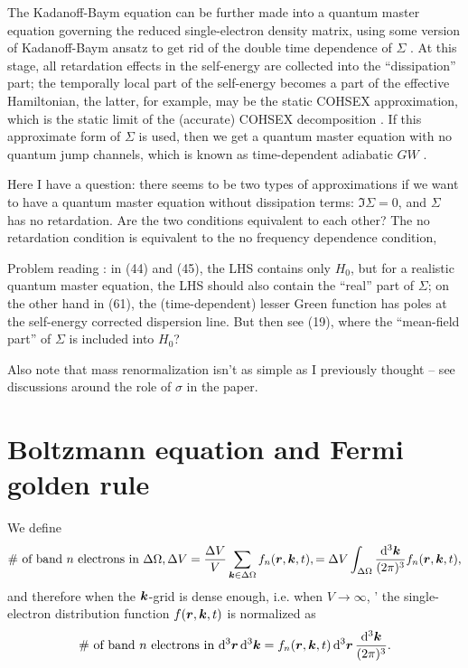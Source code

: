 \documentclass[hyperref, a4paper]{article}
\begin{document}
The Kadanoff-Baym equation can be further made into a quantum master equation 
governing the reduced single-electron density matrix, 
using some version of Kadanoff-Baym ansatz 
to get rid of the double time dependence of $\Sigma$
\cite{lipavsky1986generalized,PhysRevB.92.205304,vspivcka2005long,hermanns2013few}.
At this stage, all retardation effects in the self-energy 
are collected into the ``dissipation'' part;
the temporally local part of the self-energy 
becomes a part of the effective Hamiltonian,
the latter, for example, may be the static COHSEX approximation,
which is the static limit of the (accurate) COHSEX decomposition
\cite{faber2014electronic}.
If this approximate form of $\Sigma$ is used,
then we get a quantum master equation 
with no quantum jump channels,
which is known as time-dependent adiabatic $GW$ \cite{attaccalite2011real,chan2021giant}.

Here I have a question: 
there seems to be two types of approximations 
if we want to have a quantum master equation without dissipation terms:
$\Im \Sigma = 0$, 
and $\Sigma$ has no retardation.
Are the two conditions equivalent to each other?
The no retardation condition is equivalent to the no frequency dependence condition,

Problem reading \cite{vspivcka2005long}:
in (44) and (45), 
the LHS contains only $H_0$,
but for a realistic quantum master equation,
the LHS should also contain the ``real'' part of $\Sigma$;
on the other hand in (61),
the (time-dependent) lesser Green function 
has poles at the self-energy corrected dispersion line.
But then see (19), where the ``mean-field part'' of $\Sigma$
is included into $H_0$?

Also note that mass renormalization isn't as simple as I previously thought
-- see discussions around the role of $\sigma$ in the paper.

\section{Boltzmann equation and Fermi golden rule}

We define
\[
    \text{\# of band $n$ electrons in $\Delta \Omega, \Delta V$}
    = \frac{\Delta V}{V} \sum_{\vb*{k} \in \Delta \Omega} f_{n} (\vb*{r}, \vb*{k}, t),
    = \Delta V \int_{\Delta \Omega} \frac{\dd[3]{\vb*{k}}}{(2\pi)^3} f_n (\vb*{r}, \vb*{k}, t),
\]
and therefore when the $\vb*{k}$-grid is dense enough, i.e. when $V \to \infty$, '
the single-electron distribution function $f(\vb*{r}, \vb*{k}, t)$ is 
normalized as
\begin{equation}
    \text{\# of band $n$ electrons in $\dd[3]{\vb*{r}} \dd[3]{\vb*{k}}$} 
    = f_n(\vb*{r}, \vb*{k}, t) \dd[3]{\vb*{r}} \frac{\dd[3]{\vb*{k}}}{(2\pi)^3}.
\end{equation}
\end{document}
